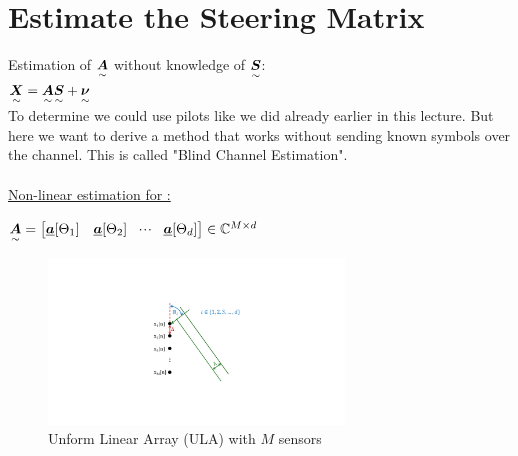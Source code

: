 \section{Estimate the Steering Matrix}
Estimation of $\underset{\sim}{\boldsymbol {A}}$ without knowledge of $\underset{\sim}{\boldsymbol {S}}$:\\
$\underset{\sim}{\boldsymbol {X}}=\underset{\sim}{\boldsymbol {A}}\underset{\sim}{\boldsymbol {S}}+\underset{\sim}{\boldsymbol {\nu}}$\\
To determine  we could use pilots like we did already earlier in this lecture. But here we want to derive a method that works without sending known symbols over the channel. This is called "Blind Channel Estimation".\\ \\
\underline{Non-linear estimation for :}\\
\begin{doublespace}
$\underset{\sim}{\boldsymbol {A}}=\begin{bmatrix} \underline{\boldsymbol {a}}[\Theta_1]&\underline{\boldsymbol {a}}[\Theta_2]&\!\cdot \!\cdot\!\cdot\!&\underline{\boldsymbol {a}}[\Theta_d] \end{bmatrix} \in\mathbb{C}^{M\times d}$\\
\begin{figure}[H]
	\centering
		\includegraphics[trim =6cm 5.5cm 6cm 4cm, clip, width=0.70\textwidth]{graphics/ULA_Angle_theta_M_Sensors.pdf}
	\caption{Unform Linear Array (ULA) with $M$ sensors}
	\label{fig:ULA_Angle_theta_M_Sensors}
\end{figure}


\end{doublespace}
